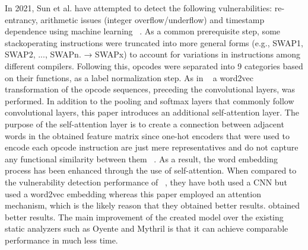 In 2021, Sun et al. have attempted to detect the following vulnerabilities: re-entrancy, arithmetic issues (integer overflow/underflow) and timestamp dependence using machine learning ~\cite{grech2019gigahorse}.
As a common prerequisite step, some stackoperating instructions were truncated into more general forms (e.g., SWAP1, SWAP2, ..., SWAPn. → SWAPx) to account for variations in instructions among different compilers.
Following this, opcodes were separated into 9 categories based on their functions, as a label normalization step.
As in ~\cite{etehrTrust} a word2vec transformation of the opcode sequences, preceding the convolutional layers, was performed.
In addition to the pooling and softmax layers that commonly follow convolutional layers, this paper introduces an additional self-attention layer.
The purpose of the self-attention layer is to create a connection between adjacent words in the obtained feature matrix since one-hot encoders that were used to encode each opcode instruction are just mere representatives and do not capture any functional similarity between them ~\cite{grech2019gigahorse}.
As a result, the word embedding process has been enhanced through the use of self-attention.
When compared to the vulnerability detection performance of ~\cite{etehrTrust}, they have both used a CNN but ~\cite{etehrTrust} used a word2vec embedding whereas this paper employed an attention mechanism, which is the likely reason that they obtained better results.
obtained better results. The main improvement of the created model over the existing static analyzers such as Oyente and Mythril is that it can achieve comparable performance in much less time.


